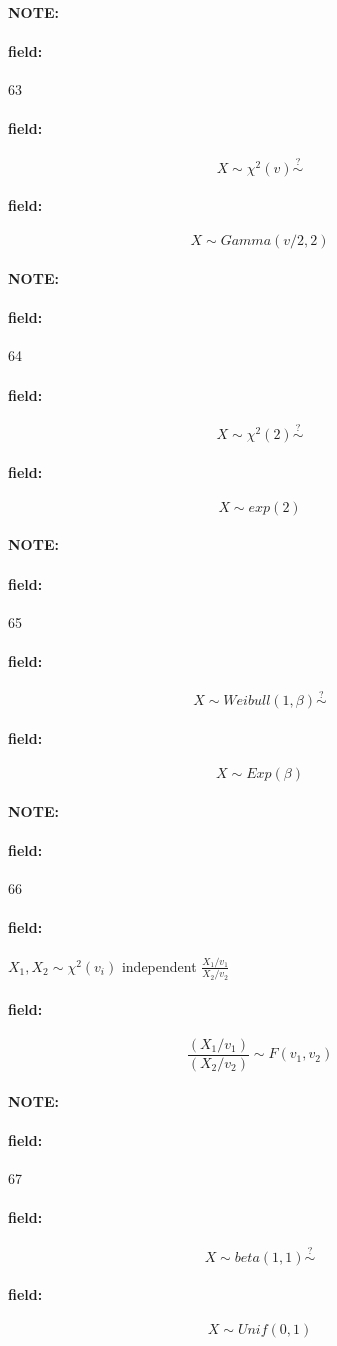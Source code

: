 \documentclass[12pt]{article}
\newenvironment{note}{\paragraph{NOTE:}}{}
\newenvironment{field}{\paragraph{field:}}{}
\begin{document}
\begin{note}
  \begin{field}
    \tiny 63
  \end{field}
  \begin{field}
    $$X \sim \chi^2(v) \overset{?}{\sim}$$
  \end{field}
  \begin{field}
    $$X \sim Gamma(v/2,2)$$

  \end{field}
\end{note}

\begin{note} \begin{field} \tiny 64 \end{field}
  \begin{field}
    $$ X \sim \chi^2(2) \overset{?}{\sim}$$
  \end{field}
  \begin{field}
    $$ X \sim exp(2)$$
  \end{field}
\end{note}

\begin{note} \begin{field} \tiny 65 \end{field}
  \begin{field}
    $$ X \sim Weibull(1,\beta) \overset{?}{\sim} $$
  \end{field}
  \begin{field}
    $$X \sim Exp(\beta)$$
  \end{field}
\end{note}


\begin{note} \begin{field} \tiny 66 \end{field}
  \begin{field}
    $X_1, X_2 \sim \chi^2(v_i)$ independent
    $ \frac{X_1/v_1}{X_2/v_2}$
  \end{field}
  \begin{field}
    $$ \frac{(X_1/v_1)}{(X_2/v_2)} \sim F(v_1,v_2)$$
  \end{field}
\end{note}



\begin{note} \begin{field} \tiny 67 \end{field}
  \begin{field}
    $$ X \sim beta(1,1) \overset{?}{\sim}$$
  \end{field}
  \begin{field}
    $$ X \sim Unif(0,1)$$
  \end{field}
\end{note}
\end{document}
